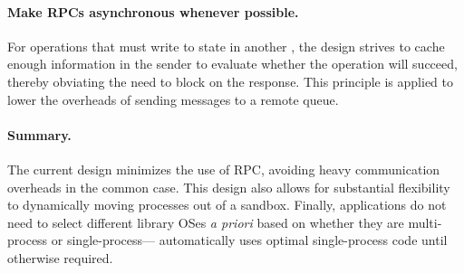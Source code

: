 \paragraph{Make RPCs asynchronous whenever possible.} 
For operations that must write to state in another \picoproc{}, 
the \graphene{} design strives to cache enough information in the sender 
to evaluate whether the operation will succeed, thereby obviating the 
need to block on the response.  This principle is applied to lower the overheads
of sending messages to a remote queue.




\paragraph{Summary.}
The current \graphene{} design minimizes the use of RPC,
avoiding heavy communication overheads in the common case.
This design also allows for substantial flexibility to dynamically moving processes out of
a sandbox.  Finally, applications do not need to select different 
library OSes {\em a priori} based on whether they are multi-process or single-process---\graphene{}
automatically uses optimal single-process code until otherwise required.
